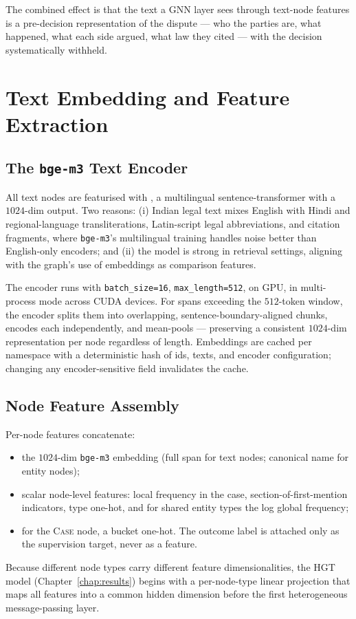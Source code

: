 The combined effect is that the text a GNN layer sees through text-node features is a pre-decision representation of the dispute --- who the parties are, what happened, what each side argued, what law they cited --- with the decision systematically withheld.

\section{Text Embedding and Feature Extraction}
\label{sec:text_features}

\subsection{The \texttt{bge-m3} Text Encoder}

All text nodes are featurised with , a multilingual sentence-transformer with a $1024$-dim output. Two reasons: (i) Indian legal text mixes English with Hindi and regional-language transliterations, Latin-script legal abbreviations, and citation fragments, where \texttt{bge-m3}'s multilingual training handles noise better than English-only encoders; and (ii) the model is strong in retrieval settings, aligning with the graph's use of embeddings as comparison features.

The encoder runs with \texttt{batch\_size=16}, \texttt{max\_length=512}, on GPU, in multi-process mode across CUDA devices. For spans exceeding the $512$-token window, the encoder splits them into overlapping, sentence-boundary-aligned chunks, encodes each independently, and mean-pools --- preserving a consistent $1024$-dim representation per node regardless of length. Embeddings are cached per namespace with a deterministic hash of ids, texts, and encoder configuration; changing any encoder-sensitive field invalidates the cache.

\subsection{Node Feature Assembly}

Per-node features concatenate:
\begin{itemize}
  \item the $1024$-dim \texttt{bge-m3} embedding (full span for text nodes; canonical name for entity nodes);
  \item scalar node-level features: local frequency in the case, section-of-first-mention indicators, type one-hot, and for shared entity types the log global frequency;
  \item for the \textsc{Case} node, a bucket one-hot. The outcome label is attached only as the supervision target, never as a feature.
\end{itemize}

Because different node types carry different feature dimensionalities, the HGT model (Chapter~\ref{chap:results}) begins with a per-node-type linear projection that maps all features into a common hidden dimension before the first heterogeneous message-passing layer.
